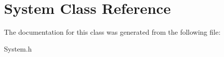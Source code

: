 \hypertarget{classSystem}{}\section{System Class Reference}
\label{classSystem}


The documentation for this class was generated from the following file\+:\begin{DoxyCompactItemize}
\item 
System.\+h\end{DoxyCompactItemize}
